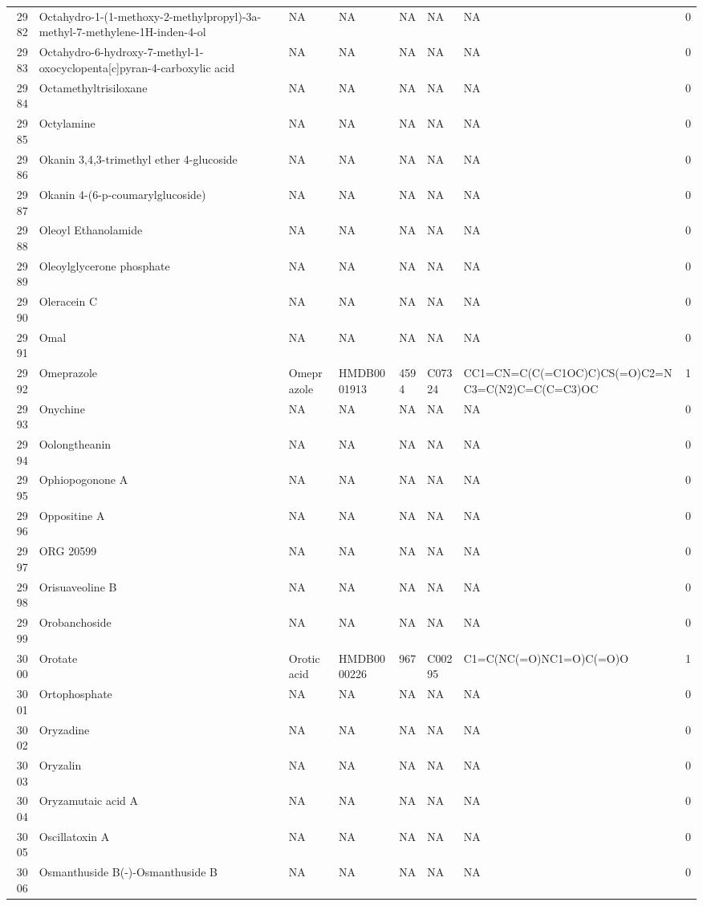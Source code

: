 \documentclass[a4paper]{article}
\begin{document}
\begin{longtable}{rlllllll}
  2982 & Octahydro-1-(1-methoxy-2-methylpropyl)-3a-methyl-7-methylene-1H-inden-4-ol & NA & NA & NA & NA & NA & 0 \\ 
  2983 & Octahydro-6-hydroxy-7-methyl-1-oxocyclopenta[c]pyran-4-carboxylic acid & NA & NA & NA & NA & NA & 0 \\ 
  2984 & Octamethyltrisiloxane & NA & NA & NA & NA & NA & 0 \\ 
  2985 & Octylamine & NA & NA & NA & NA & NA & 0 \\ 
  2986 & Okanin 3,4,3-trimethyl ether 4-glucoside & NA & NA & NA & NA & NA & 0 \\ 
  2987 & Okanin 4-(6-p-coumarylglucoside) & NA & NA & NA & NA & NA & 0 \\ 
  2988 & Oleoyl Ethanolamide & NA & NA & NA & NA & NA & 0 \\ 
  2989 & Oleoylglycerone phosphate & NA & NA & NA & NA & NA & 0 \\ 
  2990 & Oleracein C & NA & NA & NA & NA & NA & 0 \\ 
  2991 & Omal & NA & NA & NA & NA & NA & 0 \\ 
  2992 & Omeprazole & Omeprazole & HMDB0001913 & 4594 & C07324 & CC1=CN=C(C(=C1OC)C)CS(=O)C2=NC3=C(N2)C=C(C=C3)OC & 1 \\ 
  2993 & Onychine & NA & NA & NA & NA & NA & 0 \\ 
  2994 & Oolongtheanin & NA & NA & NA & NA & NA & 0 \\ 
  2995 & Ophiopogonone A & NA & NA & NA & NA & NA & 0 \\ 
  2996 & Oppositine A & NA & NA & NA & NA & NA & 0 \\ 
  2997 & ORG 20599 & NA & NA & NA & NA & NA & 0 \\ 
  2998 & Orisuaveoline B & NA & NA & NA & NA & NA & 0 \\ 
  2999 & Orobanchoside & NA & NA & NA & NA & NA & 0 \\ 
  3000 & Orotate & Orotic acid & HMDB0000226 & 967 & C00295 & C1=C(NC(=O)NC1=O)C(=O)O & 1 \\ 
  3001 & Ortophosphate & NA & NA & NA & NA & NA & 0 \\ 
  3002 & Oryzadine & NA & NA & NA & NA & NA & 0 \\ 
  3003 & Oryzalin & NA & NA & NA & NA & NA & 0 \\ 
  3004 & Oryzamutaic acid A & NA & NA & NA & NA & NA & 0 \\ 
  3005 & Oscillatoxin A & NA & NA & NA & NA & NA & 0 \\ 
  3006 & Osmanthuside B(-)-Osmanthuside B & NA & NA & NA & NA & NA & 0 \\ 

\end{longtable}
\end{document}
